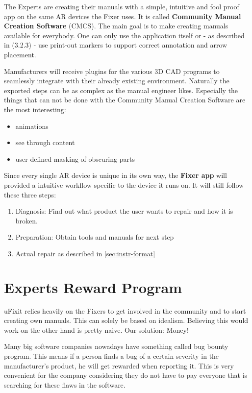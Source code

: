 		The Experts are creating their manuals with a simple, intuitive and fool proof app on the same AR devices the Fixer uses. It is called \textbf{Community Manual Creation Software} (CMCS). The main goal is to make creating manuals available for everybody. One can only use the application itself or - as described in (3.2.3) - use print-out markers to support correct annotation and arrow placement.
		
		Manufacturers will receive plugins for the various 3D CAD programs to seamlessly integrate with their already existing environment. Naturally the exported steps can be as complex as the manual engineer likes. Especially the things that can not be done with the Community Manual Creation Software are the most interesting:
		
		\begin{itemize}
			\itemsep0em
			\item animations
			\item see through content
			\item user defined masking of obscuring parts
		\end{itemize}
		
		Since every single AR device is unique in its own way, the \textbf{Fixer app} will provided a intuitive workflow specific to the device it runs on. It will still follow these three steps:
		
		\begin{enumerate}
			\itemsep0em
			\item Diagnosis: Find out what product the user wants to repair and how it is broken.
			\item Preparation: Obtain tools and manuals for next step
			\item Actual repair as described in \eqref{sec:instr-format}
		\end{enumerate}
		
		
	\section{Experts Reward Program}
	
		uFixit relies heavily on the Fixers to get involved in the community and to start creating own manuals. This can solely be based on idealism. Believing this would work on the other hand is pretty naive. Our solution: Money!
		
		Many big software companies nowadays have something called bug bounty program. This means if a person finds a bug of a certain severity in the manufacturer’s product, he will get rewarded when reporting it. This is very convenient for the company considering they do not have to pay everyone that is searching for these flaws in the software.
		
